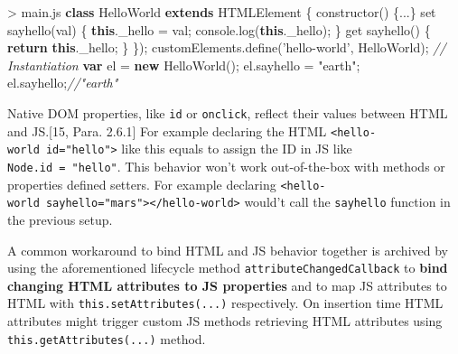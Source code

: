 \documentclass[]{article}
\newenvironment{Shaded}{}{}
\newcommand{\KeywordTok}[1]{\textcolor[rgb]{0.00,0.44,0.13}{\textbf{{#1}}}}
\newcommand{\StringTok}[1]{\textcolor[rgb]{0.25,0.44,0.63}{{#1}}}
\newcommand{\CommentTok}[1]{\textcolor[rgb]{0.38,0.63,0.69}{\textit{{#1}}}}
\newcommand{\VariableTok}[1]{\textcolor[rgb]{0.10,0.09,0.49}{{#1}}}
\newcommand{\ControlFlowTok}[1]{\textcolor[rgb]{0.00,0.44,0.13}{\textbf{{#1}}}}
\newcommand{\OperatorTok}[1]{\textcolor[rgb]{0.40,0.40,0.40}{{#1}}}
\newcommand{\AttributeTok}[1]{\textcolor[rgb]{0.49,0.56,0.16}{{#1}}}
\newcommand{\NormalTok}[1]{{#1}}
\begin{document}
\begin{Shaded}
\begin{Highlighting}[]
\OperatorTok{>} \VariableTok{main}\NormalTok{.}\AttributeTok{js}
\KeywordTok{class} \NormalTok{HelloWorld }\KeywordTok{extends} \NormalTok{HTMLElement }\OperatorTok{\{}
 \AttributeTok{constructor}\NormalTok{() }\OperatorTok{\{}\NormalTok{...}\OperatorTok{\}}
 \NormalTok{set }\AttributeTok{sayhello}\NormalTok{(val) }\OperatorTok{\{}
  \KeywordTok{this}\NormalTok{.}\AttributeTok{_hello} \OperatorTok{=} \NormalTok{val}\OperatorTok{;}
  \VariableTok{console}\NormalTok{.}\AttributeTok{log}\NormalTok{(}\KeywordTok{this}\NormalTok{.}\AttributeTok{_hello}\NormalTok{)}\OperatorTok{;}
 \OperatorTok{\}}
 \NormalTok{get }\AttributeTok{sayhello}\NormalTok{() }\OperatorTok{\{}
  \ControlFlowTok{return} \KeywordTok{this}\NormalTok{.}\AttributeTok{_hello}\OperatorTok{;}
 \OperatorTok{\}}
\OperatorTok{\}}\NormalTok{)}\OperatorTok{;}
\VariableTok{customElements}\NormalTok{.}\AttributeTok{define}\NormalTok{(}\StringTok{'hello-world'}\OperatorTok{,} \NormalTok{HelloWorld)}\OperatorTok{;}
\CommentTok{// Instantiation}
\KeywordTok{var} \NormalTok{el }\OperatorTok{=} \KeywordTok{new} \AttributeTok{HelloWorld}\NormalTok{()}\OperatorTok{;}
\VariableTok{el}\NormalTok{.}\AttributeTok{sayhello} \OperatorTok{=} \StringTok{"earth"}\OperatorTok{;}
\VariableTok{el}\NormalTok{.}\AttributeTok{sayhello}\OperatorTok{;}\CommentTok{//"earth"}
\end{Highlighting}
\end{Shaded}

Native DOM properties, like \texttt{id} or \texttt{onclick}, reflect
their values between HTML and JS.{[}15, Para. 2.6.1{]} For example
declaring the HTML
\texttt{\textless{}hello-world\ id="hello"\textgreater{}} like this
equals to assign the ID in JS like \texttt{Node.id\ =\ "hello"}. This
behavior won't work out-of-the-box with methods or properties defined
setters. For example declaring
\texttt{\textless{}hello-world\ sayhello="mars"\textgreater{}\textless{}/hello-world\textgreater{}}
would't call the \texttt{sayhello} function in the previous setup.

A common workaround to bind HTML and JS behavior together is archived by
using the aforementioned lifecycle method
\texttt{attributeChangedCallback} to \textbf{bind changing HTML
attributes to JS properties} and to map JS attributes to HTML with
\texttt{this.setAttributes(...)} respectively. On insertion time HTML
attributes might trigger custom JS methods retrieving HTML attributes
using \texttt{this.getAttributes(...)} method.
\end{document}
